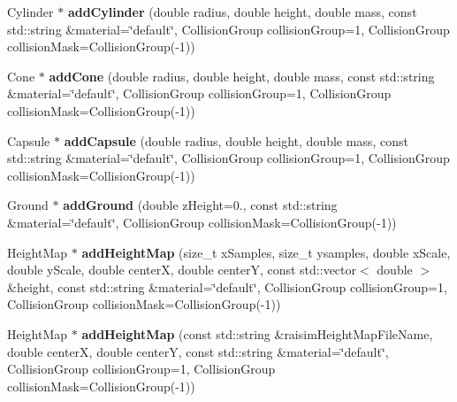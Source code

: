 \begin{DoxyCompactItemize}
Cylinder $\ast$ {\bfseries add\+Cylinder} (double radius, double height, double mass, const std\+::string \&material=\char`\"{}default\char`\"{}, Collision\+Group collision\+Group=1, Collision\+Group collision\+Mask=Collision\+Group(-\/1))
\item 
\mbox{\label{classraisim_1_1World_a7edd17d38edfdd77ad78c5406cfb5f13}} 
Cone $\ast$ {\bfseries add\+Cone} (double radius, double height, double mass, const std\+::string \&material=\char`\"{}default\char`\"{}, Collision\+Group collision\+Group=1, Collision\+Group collision\+Mask=Collision\+Group(-\/1))
\item 
\mbox{\label{classraisim_1_1World_a50cad4dad5e846db57d5020c64054769}} 
Capsule $\ast$ {\bfseries add\+Capsule} (double radius, double height, double mass, const std\+::string \&material=\char`\"{}default\char`\"{}, Collision\+Group collision\+Group=1, Collision\+Group collision\+Mask=Collision\+Group(-\/1))
\item 
\mbox{\label{classraisim_1_1World_a963f0652cf8c20e385e1ec801b8ff00d}} 
Ground $\ast$ {\bfseries add\+Ground} (double z\+Height=0., const std\+::string \&material=\char`\"{}default\char`\"{}, Collision\+Group collision\+Mask=Collision\+Group(-\/1))
\item 
\mbox{\label{classraisim_1_1World_abf034480fd9c7904e376f38e6c060cd4}} 
Height\+Map $\ast$ {\bfseries add\+Height\+Map} (size\+\_\+t x\+Samples, size\+\_\+t ysamples, double x\+Scale, double y\+Scale, double centerX, double centerY, const std\+::vector$<$ double $>$ \&height, const std\+::string \&material=\char`\"{}default\char`\"{}, Collision\+Group collision\+Group=1, Collision\+Group collision\+Mask=Collision\+Group(-\/1))
\item 
\mbox{\label{classraisim_1_1World_a374c054217ac1b6f360ad1dcd30a9b7d}} 
Height\+Map $\ast$ {\bfseries add\+Height\+Map} (const std\+::string \&raisim\+Height\+Map\+File\+Name, double centerX, double centerY, const std\+::string \&material=\char`\"{}default\char`\"{}, Collision\+Group collision\+Group=1, Collision\+Group collision\+Mask=Collision\+Group(-\/1))
\item 
\mbox{\label{classraisim_1_1World_a66ea6cd91c4a87e0f4f0abee22441c4e}} 

\end{DoxyCompactItemize}
